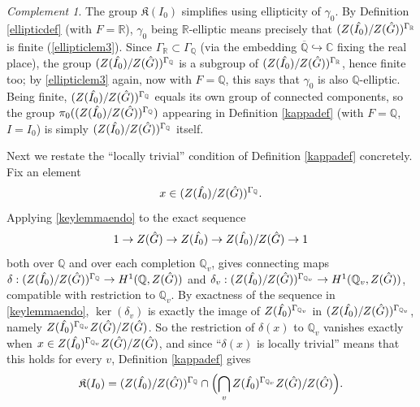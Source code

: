 \documentclass[11pt,a4paper]{article}
\theoremstyle{definition}
\theoremstyle{plain}
\theoremstyle{remark}
\newtheorem{Rc}[shared]{Complement}
\theoremstyle{plain}
\begin{document}
\begin{Rc}\label{kappasimplification}
    The group $\mathfrak{K}(I_0)$ simplifies using ellipticity of $\gamma_0$. By Definition \ref{ellipticdef} (with $F = \mathbb{R}$), $\gamma_0$ being $\mathbb{R}$-elliptic means precisely that $(Z(\Hat{I_0})/Z(\Hat{G}))^{\Gamma_{\mathbb{R}}}$ is finite (\ref{ellipticlem3}). Since $\Gamma_{\mathbb{R}} \subset \Gamma_{\mathbb{Q}}$ (via the embedding $\overline{\mathbb{Q}} \hookrightarrow \mathbb{C}$ fixing the real place), the group $(Z(\Hat{I_0})/Z(\Hat{G}))^{\Gamma_{\mathbb{Q}}}$ is a subgroup of $(Z(\Hat{I_0})/Z(\Hat{G}))^{\Gamma_{\mathbb{R}}}$, hence finite too; by \ref{ellipticlem3} again, now with $F = \mathbb{Q}$, this says that $\gamma_0$ is also $\mathbb{Q}$-elliptic. Being finite, $(Z(\Hat{I_0})/Z(\Hat{G}))^{\Gamma_{\mathbb{Q}}}$ equals its own group of connected components, so the group $\pi_0((Z(\Hat{I_0})/Z(\Hat{G}))^{\Gamma_{\mathbb{Q}}})$ appearing in Definition \ref{kappadef} (with $F = \mathbb{Q}$, $I = I_0$) is simply $(Z(\Hat{I_0})/Z(\Hat{G}))^{\Gamma_{\mathbb{Q}}}$ itself.

    Next we restate the ``locally trivial'' condition of Definition \ref{kappadef} concretely. Fix an element
    $$x \in (Z(\Hat{I_0})/Z(\Hat{G}))^{\Gamma_{\mathbb{Q}}}.$$
    Applying \ref{keylemmaendo} to the exact sequence $$1 \to Z(\Hat{G}) \to Z(\Hat{I_0}) \to Z(\Hat{I_0})/Z(\Hat{G}) \to 1$$ both over $\mathbb{Q}$ and over each completion $\mathbb{Q}_v$, gives connecting maps $\delta: (Z(\Hat{I_0})/Z(\Hat{G}))^{\Gamma_{\mathbb{Q}}} \to H^1(\mathbb{Q}, Z(\Hat{G}))$ and $\delta_v: (Z(\Hat{I_0})/Z(\Hat{G}))^{\Gamma_{\mathbb{Q}_v}} \to H^1(\mathbb{Q}_v, Z(\Hat{G}))$, compatible with restriction to $\mathbb{Q}_v$. By exactness of the sequence in \ref{keylemmaendo}, $\ker(\delta_v)$ is exactly the image of $Z(\Hat{I_0})^{\Gamma_{\mathbb{Q}_v}}$ in $(Z(\Hat{I_0})/Z(\Hat{G}))^{\Gamma_{\mathbb{Q}_v}}$, namely $Z(\Hat{I_0})^{\Gamma_{\mathbb{Q}_v}}Z(\Hat{G})/Z(\Hat{G})$. So the restriction of $\delta(x)$ to $\mathbb{Q}_v$ vanishes exactly when $x \in Z(\Hat{I_0})^{\Gamma_{\mathbb{Q}_v}}Z(\Hat{G})/Z(\Hat{G})$, and since ``$\delta(x)$ is locally trivial'' means that this holds for every $v$, Definition \ref{kappadef} gives
    $$\mathfrak{K}(I_0) = (Z(\Hat{I_0})/Z(\Hat{G}))^{\Gamma_{\mathbb{Q}}} \cap \Bigl( \bigcap_v Z(\Hat{I_0})^{\Gamma_{\mathbb{Q}_v}} Z(\Hat{G})/Z(\Hat{G}) \Bigr).$$


\end{Rc}
\end{document}
